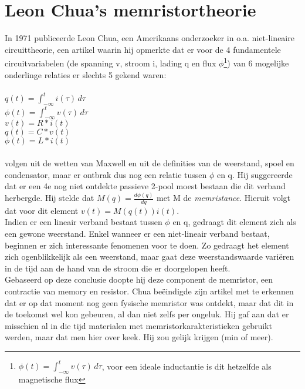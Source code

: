 \chapter{Leon Chua's memristortheorie}
\label{Chua}
In 1971 publiceerde Leon Chua, een Amerikaans onderzoeker in o.a. niet-lineaire circuittheorie, een artikel waarin hij opmerkte dat er voor de 4 fundamentele circuitvariabelen (de spanning v, stroom i, lading q en flux $\phi$\footnote{$\phi(t) =  \int^{t}_{-\infty} v(\tau) \, d\tau $, voor een ideale inductantie is dit hetzelfde als magnetische flux}) van 6 mogelijke onderlinge relaties er slechts 5 gekend waren:\\\\ $q(t) =  \int^{t}_{-\infty} i(\tau) \, d\tau $\\ $\phi(t) =  \int^{t}_{-\infty} v(\tau) \, d\tau $\\ $v(t)=R*i(t)$\\ $q(t)=C*v(t)$ \\$\phi(t) = L*i(t)$ \\\\ volgen uit de wetten van Maxwell en uit de definities van de weerstand, spoel en condensator, maar er ontbrak dus nog een relatie tussen $\phi$ en q\cite{Chu71}. Hij suggereerde dat er een 4e nog niet ontdekte passieve 2-pool moest bestaan die dit verband herbergde. Hij stelde dat $M(q)= \frac{d\phi(q)}{dq}$ met M de \emph{memristance}.
Hieruit volgt dat voor dit element $v(t)=M(q(t)) i(t)$.\\ Indien er een lineair verband bestaat tussen $\phi$ en q, gedraagt dit element zich als een gewone weerstand. Enkel wanneer er een niet-lineair verband bestaat, beginnen er zich interessante fenomenen voor te doen. Zo gedraagt het element zich ogenblikkelijk als een weerstand, maar gaat deze weerstandswaarde variëren in de tijd aan de hand van de stroom die er doorgelopen heeft.\\
Gebaseerd op deze conclusie doopte hij deze component de memristor, een contractie van memory en resistor.
Chua beëindigde zijn artikel met te erkennen dat er op dat moment nog geen fysische memristor was ontdekt, maar dat dit in de toekomst wel kon gebeuren, al dan niet zelfs per ongeluk. Hij gaf aan dat er misschien al in die tijd materialen met memristorkarakteristieken gebruikt werden, maar dat men hier over keek. Hij zou gelijk krijgen (min of meer).

